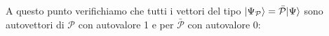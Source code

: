 \begin{enumerate}
A questo punto verifichiamo che tutti i vettori del tipo $\normalsize| \Psi_{\mathcal{P}} \normalsize\rangle = \bar{\mathcal{P}} \normalsize| \Psi \normalsize\rangle$ sono autovettori di $\mathcal{P}$ con autovalore 1 e per $\bar{\mathcal{P}}$ con autovalore 0:

\begin{comment}
	

$\langle T\rangle$
$\downarrow$ A. 
$\pm$ /. 
$\lambda$ ? 
$${\mathcal{P}}\left|\Psi_{\mathcal{P}}\right\rangle={\mathcal{P}}^{2}\left|\Psi\right\rangle={\mathcal{P}}\left|\Psi\right\rangle=+1\left|\Psi_{\mathcal{P}}\right\rangle$$
$$\overline{{{\mathcal{P}}}}\left|\Psi_{\mathcal{P}}\right\rangle=\overline{{{\mathcal{P}}}}\mathcal{P}\left|\Psi\right\rangle=0\left|\Psi_{\mathcal{P}}\right\rangle$$
2|\Psii = P |\Psii = +1 |\PsiP i P |\PsiP i = *PP |*\Psii = 0 |\PsiP i
Allo stesso modo si pu'o verificare che |\PsiP
i = P |\Psii 'e autovettore per P con autovalore 0 e per P con autovalore
+1. Abbiamo gi'a intuito grazie a queste considerazioni che lo spettro di un operatore di proiezione sar'a formato da soli due autovalori σ(P) = {0, 1}
e gli autovettori possono decomporre lo spazio di Hilbert come somma diretta dei loro due sottospazi di appartenenza H = H1 ⊕ H0 Facciamo alcuni esempi di operatori di proiezione:
- P\Psi ≡ |\Psiih\Psi| che agisce come P\Psi |Φi = |\Psii h\Psi|Φi |Φ*i ∈ H*
quello che abbiamo fatto 'e la proiezione di un generico vettore dello spazio di Hilbert lungo una determinata direzione orientata.

- Sia |\Psiii i = {1*, ...q*} una base ortonormale per un certo sottospazio Hq ⊆ H. Possiamo definire il proiettore associato a questa base come la somma dei proiettori dell'esempio precedente

$\mathcal{P}_{\Psi}\left|\Phi\right\rangle=\left|\Psi\right\rangle\left\langle\Psi|\Phi\right\rangle$. 
$|\Phi\rangle\in\mathcal{H}$. 
$${\mathcal{P}}_{q}=\sum_{i=1}^{q}|\Psi_{i}\rangle\!\langle\Psi_{i}|$$
in questo caso il vettore generico viene proiettato in un sottospazio dello spazio di Hilbert di dimensione maggiore di 1. L'introduzione di questo proiettore, in aggiunta al teorema spettrale, ci permette di arrivare alla *decomposizione spettrale* di un operatore autoaggiunto associato a un'osservabile fisica

$$A=\sum_{k\in\sigma_{d}(A)}\sum_{i=1}^{d}a_{k,i}\,|a_{k,i}\rangle\!\langle a_{k,i}|+\int_{\sigma_{c}(A)}\mathrm{d}a\,a\,|a\rangle\!\langle a|$$
$$(1.9)$$

- Consideriamo lo spazio di Hilbert pi'u semplice che possiamo incontrare: H = C
2, e gli operatori espressi come matrici quadrate


\end{comment}
\end{enumerate}
